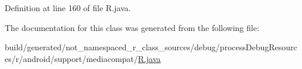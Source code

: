 Definition at line 160 of file R.\+java.



The documentation for this class was generated from the following file\+:\begin{DoxyCompactItemize}
\item 
build/generated/not\+\_\+namespaced\+\_\+r\+\_\+class\+\_\+sources/debug/process\+Debug\+Resources/r/android/support/mediacompat/\mbox{\hyperlink{android_2support_2mediacompat_2_r_8java}{R.\+java}}\end{DoxyCompactItemize}
